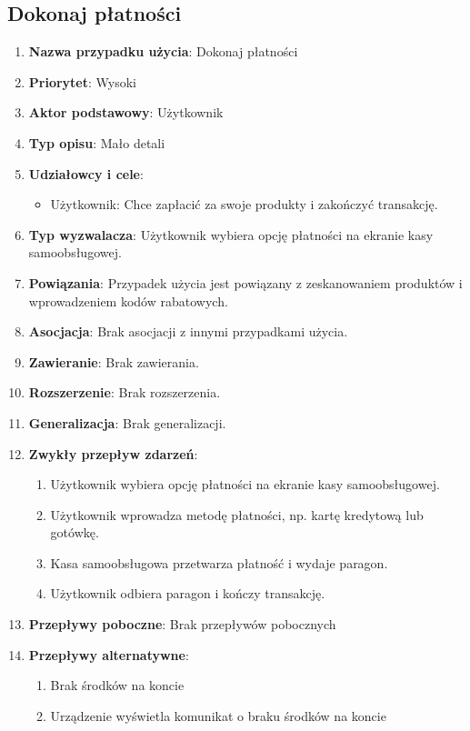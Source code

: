 \documentclass{article}
\begin{document}
\subsection{Dokonaj płatności}
\begin{enumerate}
\item \textbf{Nazwa przypadku użycia}: Dokonaj płatności
\item \textbf{Priorytet}: Wysoki
\item \textbf{Aktor podstawowy}: Użytkownik
\item \textbf{Typ opisu}: Mało detali
\item \textbf{Udziałowcy i cele}:
\begin{itemize}
\item Użytkownik: Chce zapłacić za swoje produkty i zakończyć transakcję.
\end{itemize}
\item \textbf{Typ wyzwalacza}: Użytkownik wybiera opcję płatności na ekranie kasy samoobsługowej.
\item \textbf{Powiązania}: Przypadek użycia jest powiązany z zeskanowaniem produktów i wprowadzeniem kodów rabatowych.
\item \textbf{Asocjacja}: Brak asocjacji z innymi przypadkami użycia.
\item \textbf{Zawieranie}: Brak zawierania.
\item \textbf{Rozszerzenie}: Brak rozszerzenia.
\item \textbf{Generalizacja}: Brak generalizacji.
\item \textbf{Zwykły przepływ zdarzeń}:
\begin{enumerate}
\item Użytkownik wybiera opcję płatności na ekranie kasy samoobsługowej.
\item Użytkownik wprowadza metodę płatności, np. kartę kredytową lub gotówkę.
\item Kasa samoobsługowa przetwarza płatność i wydaje paragon.
\item Użytkownik odbiera paragon i kończy transakcję.
\end{enumerate}
\item \textbf{Przepływy poboczne}:
Brak przepływów pobocznych
\item \textbf{Przepływy alternatywne}:
\begin{enumerate}
    \item Brak środków na koncie 
    \item Urządzenie wyświetla komunikat o braku środków na koncie
\end{enumerate}
\end{enumerate}
\end{document}
